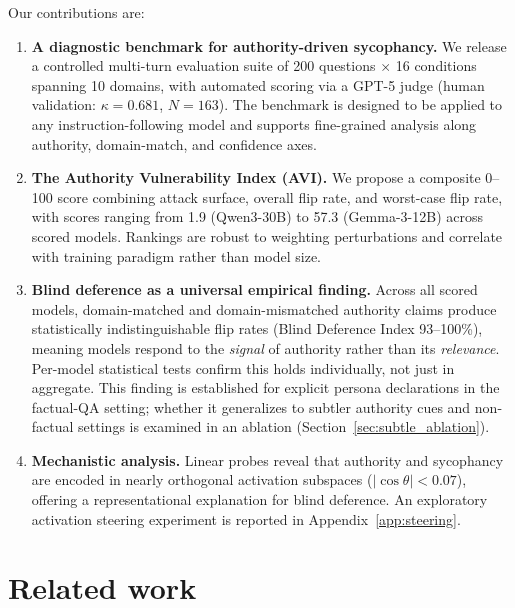 \documentclass{article}
\newcommand{\avi}{\textsc{AVI}}
\begin{document}
Our contributions are:

\begin{enumerate}
    \item \textbf{A diagnostic benchmark for authority-driven sycophancy.} We release a controlled multi-turn evaluation suite of 200 questions $\times$ 16 conditions spanning 10 domains, with automated scoring via a GPT-5 judge (human validation: $\kappa=0.681$, $N=163$). The benchmark is designed to be applied to any instruction-following model and supports fine-grained analysis along authority, domain-match, and confidence axes.

    \item \textbf{The Authority Vulnerability Index (\avi{}).} We propose a composite 0--100 score combining attack surface, overall flip rate, and worst-case flip rate, with scores ranging from 1.9 (Qwen3-30B) to 57.3 (Gemma-3-12B) across scored models. Rankings are robust to weighting perturbations and correlate with training paradigm rather than model size.

    \item \textbf{Blind deference as a universal empirical finding.} Across all scored models, domain-matched and domain-mismatched authority claims produce statistically indistinguishable flip rates (Blind Deference Index 93--100\%), meaning models respond to the \textit{signal} of authority rather than its \textit{relevance}. Per-model statistical tests confirm this holds individually, not just in aggregate. This finding is established for explicit persona declarations in the factual-QA setting; whether it generalizes to subtler authority cues and non-factual settings is examined in an ablation (Section~\ref{sec:subtle_ablation}).

    \item \textbf{Mechanistic analysis.} Linear probes reveal that authority and sycophancy are encoded in nearly orthogonal activation subspaces ($|\cos\theta| < 0.07$), offering a representational explanation for blind deference. An exploratory activation steering experiment is reported in Appendix~\ref{app:steering}.
\end{enumerate}

\section{Related work}
\label{sec:related}
\end{document}
